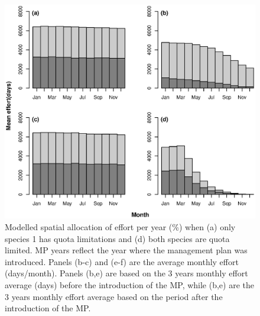\documentclass[12pt,oneline,a4paper,numbib]{ouparticle}
\numberwithin{equation}{subsection} %
\begin{document}
\begin{figure}[!ht]
\centering
\includegraphics[width=\textwidth]{Figures/Meaneffort.eps} 
\caption{Modelled spatial allocation of effort per year (\%) when (a) only species 1 has quota limitations and (d) both species are quota limited.  MP years reflect the year where the management plan was introduced. Panels (b-c) and (e-f) are the average monthly effort (days/month). Panels (b,e) are based on the 3 years monthly effort average (days) before the introduction of the MP, while (b,e) are the 3 years monthly effort average based on the period after the introduction of the MP.}
\end{figure}
\end{document}
